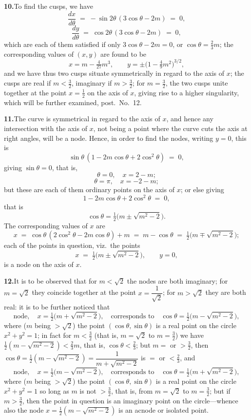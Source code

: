 \documentclass[11pt]{article}
\begin{document}
\textbf{10.}\quad To find the cusps, we have
\[
\frac{dx}{d\theta} \;=\; -\sin 2\theta\,(3\cos\theta - 2 m) \;=\; 0,
\]
\[
\frac{dy}{d\theta} \;=\; \cos 2\theta\,(3\cos\theta - 2 m) \;=\; 0,
\]
which are each of them satisfied if only $3\cos\theta - 2 m = 0$, or $\cos\theta = \tfrac{2}{3} m$; the corresponding values of $(x, y)$ are found to be
\[
x = m - \tfrac{4}{27} m^{3},\qquad y = \pm \bigl(1 - \tfrac{4}{9} m^{2}\bigr)^{3/2},
\]
and we have thus two cusps situate symmetrically in regard to the axis of $x$; the cusps are real if $m < \tfrac{3}{2}$, imaginary if $m > \tfrac{3}{2}$; for $m = \tfrac{3}{2}$, the two cusps unite together at the point $x = \tfrac{1}{2}$ on the axis of $x$, giving rise to a higher singularity, which will be further examined, post.\ No.~12.

\textbf{11.}\quad The curve is symmetrical in regard to the axis of $x$, and hence any intersection with the axis of $x$, not being a point where the curve cuts the axis at right angles, will be a node. Hence, in order to find the nodes, writing $y = 0$, this is
\[
\sin\theta\,(1 - 2 m\cos\theta + 2\cos^{2}\theta) \;=\; 0,
\]
giving $\sin\theta = 0$, that is,
\[
\theta = 0,\quad x = 2 - m;
\]
\[
\theta = \pi,\quad x = -2 - m;
\]
but these are each of them ordinary points on the axis of $x$; or else giving
\[
1 - 2 m\cos\theta + 2\cos^{2}\theta \;=\; 0,
\]
that is
\[
\cos\theta = \tfrac{1}{2}\bigl(m \pm \sqrt{m^{2} - 2}\bigr).
\]
The corresponding values of $x$ are
\[
x \;=\; \cos\theta\,(2\cos^{2}\theta - 2 m\cos\theta) + m \;=\; m - \cos\theta \;=\; \tfrac{1}{2}\bigl(m \mp \sqrt{m^{2} - 2}\bigr);
\]
each of the points in question, viz.\ the points
\[
x \;=\; \tfrac{1}{2}\bigl(m \pm \sqrt{m^{2} - 2}\bigr),\qquad y = 0,
\]
is a node on the axis of $x$.

\textbf{12.}\quad It is to be observed that for $m < \sqrt{2}$ the nodes are both imaginary; for $m = \sqrt{2}$ they coincide together at the point $x = \dfrac{1}{\sqrt{2}}$; for $m > \sqrt{2}$ they are both real: it is to be further noticed that
\[
\text{node},\quad x = \tfrac{1}{2}\bigl(m + \sqrt{m^{2} - 2}\bigr),\quad \text{corresponds to}\quad \cos\theta = \tfrac{1}{2}\bigl(m - \sqrt{m^{2} - 2}\bigr),
\]
where ($m$ being $> \sqrt{2}$) the point $(\cos\theta, \sin\theta)$ is a real point on the circle $x^{2} + y^{2} = 1$; in fact for $m < \tfrac{3}{2}$ (that is, $m = \sqrt{2}$ to $m = \tfrac{3}{2}$) we have $\tfrac{1}{2}(m - \sqrt{m^{2} - 2}) < \tfrac{2}{3} m$, that is, $\cos\theta < \tfrac{2}{3}$; but $m =$ or $> \tfrac{3}{2}$, then $\cos\theta = \tfrac{1}{2}(m - \sqrt{m^{2} - 2}) = \dfrac{1}{m + \sqrt{m^{2} - 2}}$ is $=$ or $< \tfrac{2}{3}$, and
\[
\text{node},\quad x = \tfrac{1}{2}\bigl(m - \sqrt{m^{2} - 2}\bigr),\quad \text{corresponds to}\quad \cos\theta = \tfrac{1}{2}\bigl(m + \sqrt{m^{2} - 2}\bigr),
\]
where ($m$ being $> \sqrt{2}$) the point $(\cos\theta, \sin\theta)$ is a real point on the circle $x^{2} + y^{2} = 1$ so long as $m$ is not $> \tfrac{3}{2}$, that is, from $m = \sqrt{2}$ to $m = \tfrac{3}{2}$; but if $m > \tfrac{3}{2}$, then the point in question is an imaginary point on the circle---whence also the node $x = \tfrac{1}{2}(m - \sqrt{m^{2} - 2})$ is an acnode or isolated point.
\end{document}
